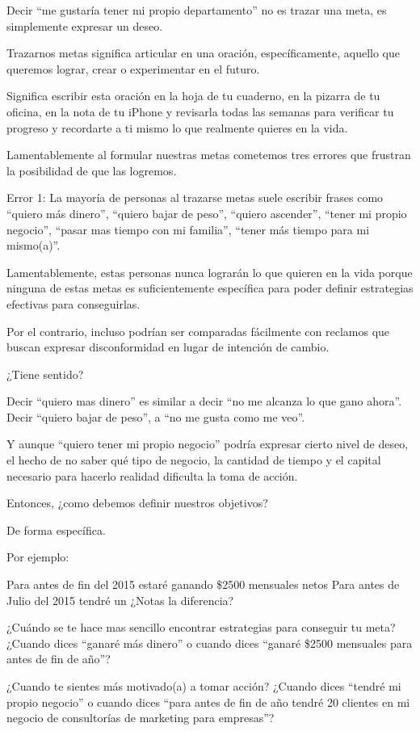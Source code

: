 \documentclass[12pt]{book}
\begin{document}
Decir “me gustaría tener mi propio departamento” no es trazar una meta, es simplemente expresar un deseo.

Trazarnos metas significa articular en una oración, específicamente, aquello que queremos lograr, crear o experimentar en el futuro.

Significa escribir esta oración en la hoja de tu cuaderno, en la pizarra de tu oficina, en la nota de tu iPhone y revisarla todas las semanas para verificar tu progreso y recordarte a ti mismo lo que realmente quieres en la vida.

Lamentablemente al formular nuestras metas cometemos tres errores que frustran la posibilidad de que las logremos.

Error 1:
La mayoría de personas al trazarse metas suele escribir frases como “quiero más dinero”, “quiero bajar de peso”, “quiero ascender”, “tener mi propio negocio”, “pasar mas tiempo con mi familia”, “tener más tiempo para mi mismo(a)”.

Lamentablemente, estas personas nunca lograrán lo que quieren en la vida porque ninguna de estas metas es suficientemente específica para poder definir estrategias efectivas para conseguirlas.

Por el contrario, incluso podrían ser comparadas fácilmente con reclamos que buscan expresar disconformidad en lugar de intención de cambio.

¿Tiene sentido?

Decir “quiero mas dinero” es similar a decir “no me alcanza lo que gano ahora”. Decir “quiero bajar de peso”, a “no me gusta como me veo”.

Y aunque “quiero tener mi propio negocio” podría expresar cierto nivel de deseo, el hecho de no saber qué tipo de negocio, la cantidad de tiempo y el capital necesario para hacerlo realidad dificulta la toma de acción.

Entonces, ¿como debemos definir nuestros objetivos?

De forma específica.

Por ejemplo:

Para antes de fin del 2015 estaré ganando \$2500 mensuales netos
Para antes de Julio del 2015 tendré un %
¿Notas la diferencia?

¿Cuándo se te hace mas sencillo encontrar estrategias para conseguir tu meta? ¿Cuando dices “ganaré más dinero” o cuando dices “ganaré \$2500 mensuales para antes de fin de año”?

¿Cuando te sientes más motivado(a) a tomar acción? ¿Cuando dices “tendré mi propio negocio” o cuando dices “para antes de fin de año tendré 20 clientes en mi negocio de consultorías de marketing para empresas”?
\end{document}
